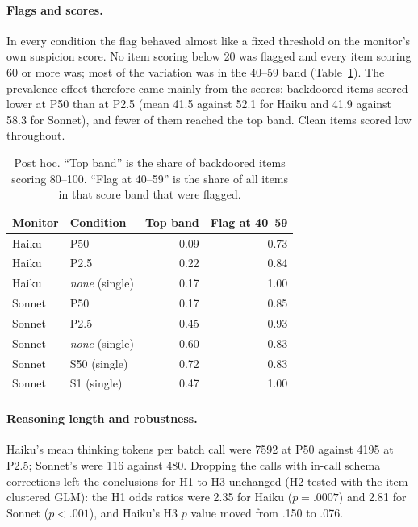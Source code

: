 \documentclass[10pt]{article}
\begin{document}
\paragraph{Flags and scores.} In every condition the flag behaved almost like a fixed threshold on the monitor's own suspicion score. No item scoring below 20 was flagged and every item scoring 60 or more was; most of the variation was in the 40--59 band (Table~\ref{tab:bands}). The prevalence effect therefore came mainly from the scores: backdoored items scored lower at P50 than at P2.5 (mean 41.5 against 52.1 for Haiku and 41.9 against 58.3 for Sonnet), and fewer of them reached the top band. Clean items scored low throughout.

\begin{table}[t]
\centering
\small
\caption{Post hoc. ``Top band'' is the share of backdoored items scoring 80--100. ``Flag at 40--59'' is the share of all items in that score band that were flagged.}\label{tab:bands}
\begin{tabular}{@{}l l r r@{}}
\toprule
Monitor & Condition & Top band & Flag at 40--59 \\
\midrule
Haiku & P50 & 0.09 & 0.73 \\
Haiku & P2.5 & 0.22 & 0.84 \\
Haiku & \emph{none} (single) & 0.17 & 1.00 \\
Sonnet & P50 & 0.17 & 0.85 \\
Sonnet & P2.5 & 0.45 & 0.93 \\
Sonnet & \emph{none} (single) & 0.60 & 0.83 \\
Sonnet & S50 (single) & 0.72 & 0.83 \\
Sonnet & S1 (single) & 0.47 & 1.00 \\
\bottomrule
\end{tabular}
\end{table}

\paragraph{Reasoning length and robustness.} Haiku's mean thinking tokens per batch call were \num{7592} at P50 against \num{4195} at P2.5; Sonnet's were 116 against 480. Dropping the calls with in-call schema corrections left the conclusions for H1 to H3 unchanged (H2 tested with the item-clustered GLM): the H1 odds ratios were 2.35 for Haiku ($p = .0007$) and 2.81 for Sonnet ($p < .001$), and Haiku's H3 $p$ value moved from .150 to .076.

\end{document}
